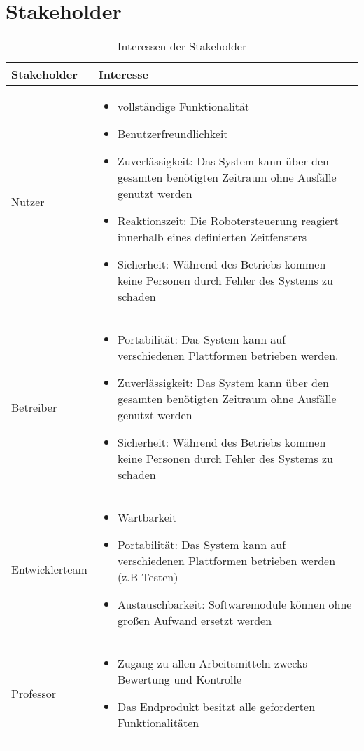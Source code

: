 \section{Stakeholder}
\begin{table}[h!]
	\caption{Interessen der Stakeholder}
	\label{tab:stakeholder}
	\centering
	\begin{tabular}{|p{2.5cm}|p{10cm}|}
		\hline
		\textbf{Stakeholder} & \textbf{Interesse}  \\
		\hline
		Nutzer   
		& \parbox{10cm}{\begin{itemize}
				\item vollständige Funktionalität
				\item Benutzerfreundlichkeit
				\item Zuverlässigkeit: Das System kann über den gesamten benötigten Zeitraum ohne Ausfälle genutzt werden
				\item Reaktionszeit: Die Robotersteuerung reagiert innerhalb eines definierten Zeitfensters
				\item Sicherheit: Während des Betriebs kommen keine Personen durch Fehler des Systems zu schaden
		\end{itemize}}
		\\
		\hline
		Betreiber 
		&\parbox{10cm}{\begin{itemize}
				\item Portabilität: Das System kann auf verschiedenen Plattformen betrieben werden.
				\item Zuverlässigkeit: Das System kann über den gesamten benötigten Zeitraum ohne Ausfälle genutzt werden
				\item Sicherheit: Während des Betriebs kommen keine Personen durch Fehler des Systems zu schaden
		\end{itemize}}
		\\
		\hline
		Entwicklerteam 
		&\parbox{10cm}{ \begin{itemize}
				\item Wartbarkeit
				\item Portabilität: Das System kann auf verschiedenen Plattformen betrieben werden (z.B Testen)
				\item Austauschbarkeit: Softwaremodule können ohne großen Aufwand ersetzt werden
		\end{itemize}}
		\\
		\hline
		
		Professor & \parbox{10cm}{\begin{itemize}
				\item Zugang zu allen Arbeitsmitteln zwecks Bewertung und Kontrolle
				\item Das Endprodukt besitzt alle geforderten Funktionalitäten
		\end{itemize}}
		\\
		\hline
	\end{tabular}
\end{table}
